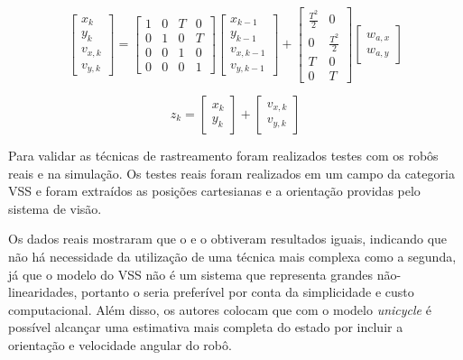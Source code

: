 \documentclass[acronym, symbols, table, deposito]{fei}
\begin{document}
\begin{equation}\label{eq:differential_equation_vsss_3}
	\begin{bmatrix}
		x_k \\ y_k \\ v_{x,k} \\ v_{y,k}
	\end{bmatrix} = 
	\begin{bmatrix}
		1 & 0 & T & 0 \\
		0 & 1 & 0 & T \\
		0 & 0 & 1 & 0 \\
		0 & 0 & 0 & 1
	\end{bmatrix}
	\begin{bmatrix}
		x_{k-1} \\ y_{k-1} \\ v_{x,k-1} \\ v_{y,k-1}
	\end{bmatrix} + 
	\begin{bmatrix}
		\frac{T^{2}}{2} & 0 \\
		0 & \frac{T^{2}}{2} \\
		T & 0 \\
		0 & T
	\end{bmatrix}
	\begin{bmatrix}
		w_{a,x} \\
		w_{a,y}
	\end{bmatrix}
\end{equation}

\begin{equation}\label{eq:differential_equation_vsss_4}
	z_k = 
	\begin{bmatrix}
		x_k \\ y_k
	\end{bmatrix} + 
	\begin{bmatrix}
		v_{x,k} \\ v_{y,k}
	\end{bmatrix}
\end{equation}

Para validar as técnicas de rastreamento foram realizados testes com os robôs reais e na simulação. Os testes reais foram realizados em um campo da categoria VSS e foram extraídos as posições cartesianas e a orientação providas pelo sistema de visão.

Os dados reais mostraram que o  e o  obtiveram resultados iguais, indicando que não há necessidade da utilização de uma técnica mais complexa como a segunda, já que o modelo do VSS não é um sistema que representa grandes não-linearidades, portanto o  seria preferível por conta da simplicidade e custo computacional. Além disso, os autores colocam que com o modelo \textit{unicycle} é possível alcançar uma estimativa mais completa do estado por incluir a orientação e velocidade angular do robô.
\end{document}
